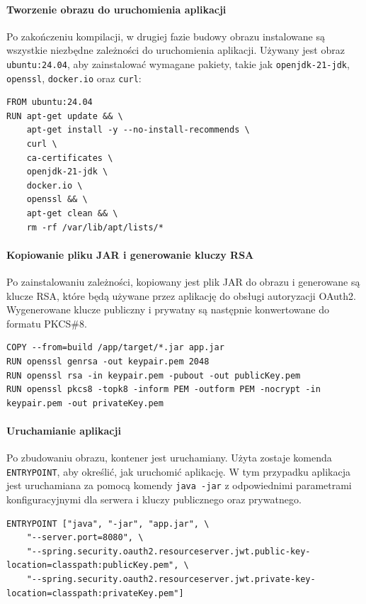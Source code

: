 \paragraph{Tworzenie obrazu do uruchomienia aplikacji}
Po zakończeniu kompilacji, w drugiej fazie budowy obrazu instalowane są wszystkie niezbędne zależności do uruchomienia aplikacji. Używany jest obraz \texttt{ubuntu:24.04}, aby zainstalować wymagane pakiety, takie jak \texttt{openjdk-21-jdk}, \texttt{openssl}, \texttt{docker.io} oraz \texttt{curl}:
\begin{lstlisting}[basicstyle=\footnotesize\ttfamily]
FROM ubuntu:24.04
RUN apt-get update && \
    apt-get install -y --no-install-recommends \
    curl \
    ca-certificates \
    openjdk-21-jdk \
    docker.io \
    openssl && \
    apt-get clean && \
    rm -rf /var/lib/apt/lists/*
\end{lstlisting}

\paragraph{Kopiowanie pliku JAR i generowanie kluczy RSA}
Po zainstalowaniu zależności, kopiowany jest plik JAR do obrazu i generowane są klucze RSA, które będą używane przez aplikację do obsługi autoryzacji OAuth2. Wygenerowane klucze publiczny i prywatny są następnie konwertowane do formatu PKCS\#8.
\begin{lstlisting}[basicstyle=\footnotesize\ttfamily]
COPY --from=build /app/target/*.jar app.jar
RUN openssl genrsa -out keypair.pem 2048
RUN openssl rsa -in keypair.pem -pubout -out publicKey.pem
RUN openssl pkcs8 -topk8 -inform PEM -outform PEM -nocrypt -in keypair.pem -out privateKey.pem
\end{lstlisting}

\paragraph{Uruchamianie aplikacji}
Po zbudowaniu obrazu, kontener jest uruchamiany. Użyta zostaje komenda \texttt{ENTRYPOINT}, aby określić, jak uruchomić aplikację. W tym przypadku aplikacja jest uruchamiana za pomocą komendy \texttt{java -jar} z odpowiednimi parametrami konfiguracyjnymi dla serwera i kluczy publicznego oraz prywatnego.
\begin{lstlisting}[basicstyle=\footnotesize\ttfamily]
ENTRYPOINT ["java", "-jar", "app.jar", \
    "--server.port=8080", \
    "--spring.security.oauth2.resourceserver.jwt.public-key-location=classpath:publicKey.pem", \
    "--spring.security.oauth2.resourceserver.jwt.private-key-location=classpath:privateKey.pem"]
\end{lstlisting}

